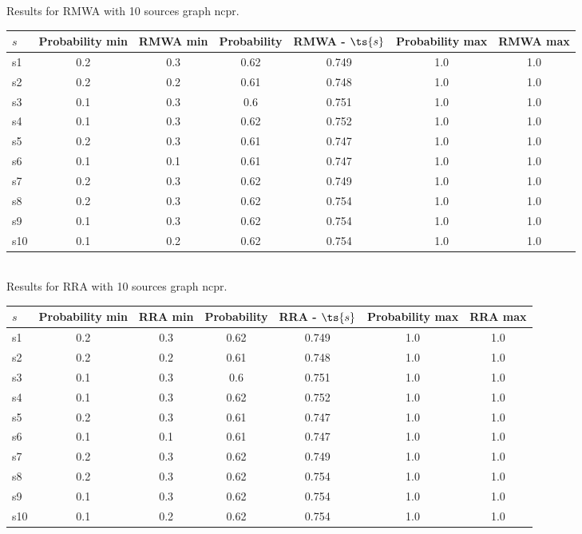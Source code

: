 \documentclass{article}
\begin{document}
\noindent Results for RMWA with 10 sources graph ncpr.

\noindent\begin{tabular}{|l|c|c|c|c|c|c|}
\hline
$s$& Probability min & RMWA min & Probability & RMWA - $\ts{s}$ & Probability max & RMWA max\\
\hline
s1 &0.2 & 0.3 & 0.62 & 0.749 & 1.0 & 1.0\\
\hline
s2 &0.2 & 0.2 & 0.61 & 0.748 & 1.0 & 1.0\\
\hline
s3 &0.1 & 0.3 & 0.6 & 0.751 & 1.0 & 1.0\\
\hline
s4 &0.1 & 0.3 & 0.62 & 0.752 & 1.0 & 1.0\\
\hline
s5 &0.2 & 0.3 & 0.61 & 0.747 & 1.0 & 1.0\\
\hline
s6 &0.1 & 0.1 & 0.61 & 0.747 & 1.0 & 1.0\\
\hline
s7 &0.2 & 0.3 & 0.62 & 0.749 & 1.0 & 1.0\\
\hline
s8 &0.2 & 0.3 & 0.62 & 0.754 & 1.0 & 1.0\\
\hline
s9 &0.1 & 0.3 & 0.62 & 0.754 & 1.0 & 1.0\\
\hline
s10 &0.1 & 0.2 & 0.62 & 0.754 & 1.0 & 1.0\\
\hline
\end{tabular}\\

\noindent Results for RRA with 10 sources graph ncpr.

\noindent\begin{tabular}{|l|c|c|c|c|c|c|}
\hline
$s$& Probability min & RRA min & Probability & RRA - $\ts{s}$ & Probability max & RRA max\\
\hline
s1 &0.2 & 0.3 & 0.62 & 0.749 & 1.0 & 1.0\\
\hline
s2 &0.2 & 0.2 & 0.61 & 0.748 & 1.0 & 1.0\\
\hline
s3 &0.1 & 0.3 & 0.6 & 0.751 & 1.0 & 1.0\\
\hline
s4 &0.1 & 0.3 & 0.62 & 0.752 & 1.0 & 1.0\\
\hline
s5 &0.2 & 0.3 & 0.61 & 0.747 & 1.0 & 1.0\\
\hline
s6 &0.1 & 0.1 & 0.61 & 0.747 & 1.0 & 1.0\\
\hline
s7 &0.2 & 0.3 & 0.62 & 0.749 & 1.0 & 1.0\\
\hline
s8 &0.2 & 0.3 & 0.62 & 0.754 & 1.0 & 1.0\\
\hline
s9 &0.1 & 0.3 & 0.62 & 0.754 & 1.0 & 1.0\\
\hline
s10 &0.1 & 0.2 & 0.62 & 0.754 & 1.0 & 1.0\\
\hline
\end{tabular}\\
\end{document}
